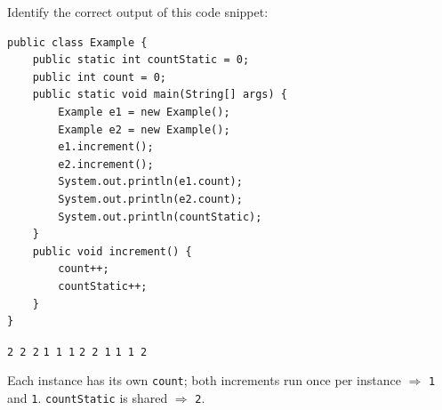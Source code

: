 \newpage

\question[4]
Identify the correct output of this code snippet:
\begin{lstlisting}[style=java]
public class Example {
    public static int countStatic = 0;
    public int count = 0;
    public static void main(String[] args) {
        Example e1 = new Example();
        Example e2 = new Example();
        e1.increment();
        e2.increment();
        System.out.println(e1.count);
        System.out.println(e2.count);
        System.out.println(countStatic);
    }
    public void increment() {
        count++;
        countStatic++;
    }
}
\end{lstlisting}
\begin{choices}
  \choice \texttt{2 2 2}
  \choice \texttt{1 1 1}
  \choice \texttt{2 2 1}
  \CorrectChoice \texttt{1 1 2}
\end{choices}
\begin{solution}
  Each instance has its own \texttt{count}; both increments run once per instance $\Rightarrow$ \texttt{1} and \texttt{1}. \texttt{countStatic} is shared $\Rightarrow$ \texttt{2}.
\end{solution}

\newpage

